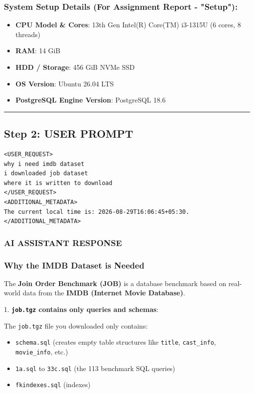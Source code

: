 \documentclass[11pt,a4paper]{article}
\begin{document}
\subsubsection{System Setup Details (For Assignment Report - "Setup"):}
\begin{itemize}
\item \textbf{CPU Model \& Cores}: 13th Gen Intel(R) Core(TM) i3-1315U (6 cores, 8 threads)
\item \textbf{RAM}: 14 GiB
\item \textbf{HDD / Storage}: 456 GiB NVMe SSD
\item \textbf{OS Version}: Ubuntu 26.04 LTS
\item \textbf{PostgreSQL Engine Version}: PostgreSQL 18.6
\end{itemize}

\hrule

\subsection{Step 2: USER PROMPT}

\begin{lstlisting}[language=text]
<USER_REQUEST>
why i need imdb dataset 
i downloaded job dataset 
where it is written to download 
</USER_REQUEST>
<ADDITIONAL_METADATA>
The current local time is: 2026-08-29T16:06:45+05:30.
</ADDITIONAL_METADATA>
\end{lstlisting}


\subsubsection{AI ASSISTANT RESPONSE}

\subsubsection{Why the IMDB Dataset is Needed}

The \textbf{Join Order Benchmark (JOB)} is a database benchmark based on real-world data from the \textbf{IMDB (Internet Movie Database)}.


1. \textbf{\texttt{job.tgz} contains only queries and schemas}:

The \texttt{job.tgz} file you downloaded only contains:

\begin{itemize}
\item \texttt{schema.sql} (creates empty table structures like \texttt{title}, \texttt{cast\_info}, \texttt{movie\_info}, etc.)
\item \texttt{1a.sql} to \texttt{33c.sql} (the 113 benchmark SQL queries)
\item \texttt{fkindexes.sql} (indexes)
\end{itemize}
\end{document}
